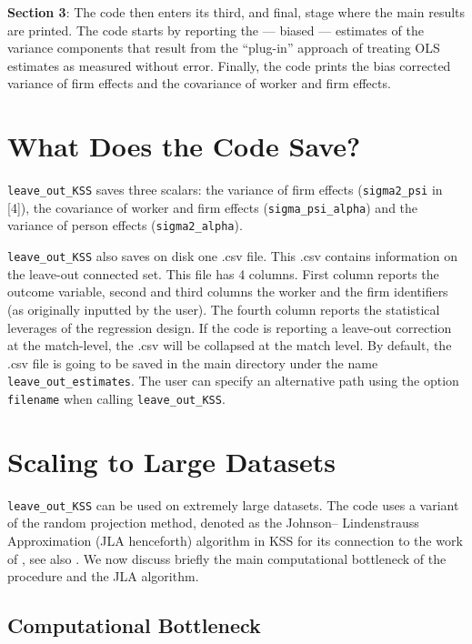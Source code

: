 \documentclass[11pt]{article}
\begin{document}
\textbf{Section 3}: The code then enters its third, and final, stage
where the main results are printed. The code starts by reporting the ---
biased --- estimates of the variance components that result from the
``plug-in'' approach of treating OLS estimates as measured without
error. Finally, the code prints the bias corrected variance of firm
effects and the covariance of worker and firm effects.

    \hypertarget{what-does-the-code-save}{%
\section{What Does the Code Save?}\label{what-does-the-code-save}}

\texttt{leave\_out\_KSS} saves three scalars: the variance of firm
effects (\texttt{sigma2\_psi} in {[}4{]}), the covariance of worker and
firm effects (\texttt{sigma\_psi\_alpha}) and the variance of person
effects (\texttt{sigma2\_alpha}).

\texttt{leave\_out\_KSS} also saves on disk one .csv file. This .csv
contains information on the leave-out connected set. This file has 4
columns. First column reports the outcome variable, second and third
columns the worker and the firm identifiers (as originally inputted by
the user). The fourth column reports the statistical leverages of the
regression design. If the code is reporting a leave-out correction at the
match-level, the .csv will be collapsed at the match level. By default,
the .csv file is going to be saved in the main directory under the name
\texttt{leave\_out\_estimates}. The user can specify an alternative path
using the option \texttt{filename} when calling
\texttt{leave\_out\_KSS}.

    \hypertarget{scaling-to-large-datasets}{%
\section{Scaling to Large Datasets}\label{scaling-to-large-datasets}}

\texttt{leave\_out\_KSS} can be used on extremely large datasets. The
code uses a variant of the random projection method, denoted as the
Johnson-- Lindenstrauss Approximation (JLA henceforth) algorithm in KSS
for its connection to the work of \cite{johnson1984extensions}, see
also \cite{achlioptas2001database}. We now discuss briefly the main computational
bottleneck of the procedure and the JLA algorithm.

\hypertarget{computational-bottleneck}{%
\subsection{Computational Bottleneck}\label{computational-bottleneck}}
\end{document}
